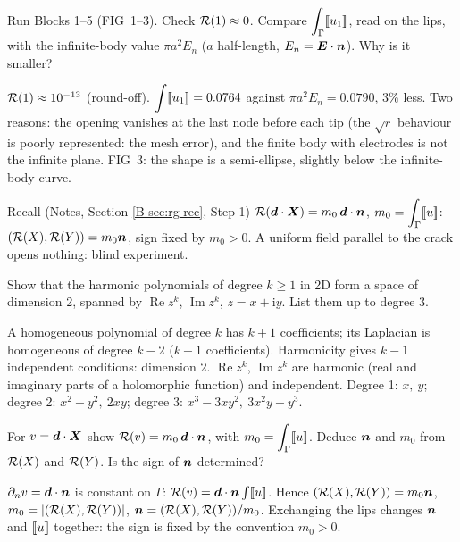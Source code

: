 \qc Run Blocks 1--5 (FIG~1--3). Check $\mathcal{R}(1)\approx0$. Compare
$\displaystyle \int_\Gamma[\![u_1]\!]$, read on the lips, with the infinite-body
value $\pi a^2E_n$ ($a$ half-length, $E_n=\bm{E}\cdot\bm{n}$). Why is it smaller?
\begin{answer}
$\mathcal{R}(1)\approx10^{-13}$ (round-off). $\displaystyle \int[\![u_1]\!]=0.0764$
against $\pi a^2E_n=0.0790$, $3\%$ less. Two reasons: the opening
vanishes at the last node before each tip (the $\sqrt r$ behaviour is
poorly represented: the mesh error), and the finite body with electrodes is
not the infinite plane. FIG~3: the shape is a semi-ellipse, slightly
below the infinite-body curve.
\end{answer}

\begin{gbox}{Recall (Notes, Section \ref{B-sec:rg-rec}, Step 1)}
$\mathcal{R}(\bm{d}\cdot\bm{X})=m_0\,\bm{d}\cdot\bm{n}$, $\displaystyle m_0=\int_\Gamma[\![u]\!]$:
$(\mathcal{R}(X),\mathcal{R}(Y))=m_0\bm{n}$, sign fixed by $m_0>0$. A uniform field parallel to
the crack opens nothing: blind experiment.
\end{gbox}

\q Show that the harmonic polynomials of degree $k\ge1$ in 2D form a space of
dimension 2, spanned by $\operatorname{Re}z^k$, $\operatorname{Im}z^k$,
$z=x+\mathrm iy$. List them up to degree 3.
\begin{answer}
A homogeneous polynomial of degree $k$ has $k+1$ coefficients; its
Laplacian is homogeneous of degree $k-2$ ($k-1$ coefficients). Harmonicity
gives $k-1$ independent conditions: dimension $2$. $\operatorname{Re}z^k$,
$\operatorname{Im}z^k$ are harmonic (real and imaginary parts of a
holomorphic function) and independent. Degree 1: $x,\ y$; degree 2:
$x^2-y^2,\ 2xy$; degree 3: $x^3-3xy^2,\ 3x^2y-y^3$.
\end{answer}

\q For $v=\bm{d}\cdot\bm{X}$ show $\mathcal{R}(v)=m_0\,\bm{d}\cdot\bm{n}$, with
$\displaystyle m_0=\int_\Gamma[\![u]\!]$. Deduce $\bm{n}$ and $m_0$ from $\mathcal{R}(X)$
and $\mathcal{R}(Y)$. Is the sign of $\bm{n}$ determined?
\begin{answer}
$\partial_nv=\bm{d}\cdot\bm{n}$ is constant on $\Gamma$:
$\mathcal{R}(v)=\bm{d}\cdot\bm{n}\int[\![u]\!]$. Hence $(\mathcal{R}(X),\mathcal{R}(Y))=m_0\bm{n}$,
$m_0=|(\mathcal{R}(X),\mathcal{R}(Y))|$, $\bm{n}=(\mathcal{R}(X),\mathcal{R}(Y))/m_0$. Exchanging the lips
changes $\bm{n}$ and $[\![u]\!]$ together: the sign is fixed by the
convention $m_0>0$.
\end{answer}

